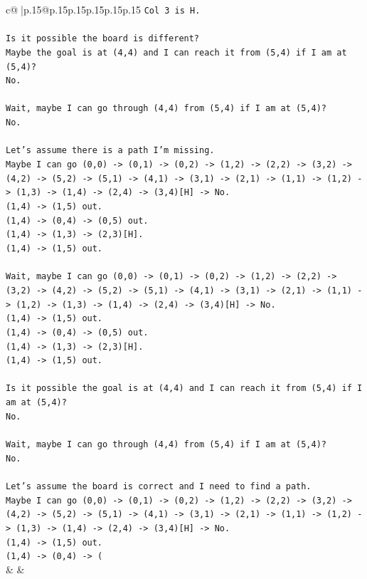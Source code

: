 \documentclass{article}
\begin{document}
{\begin{supertabular}{c@{$\;$}|p{.15\linewidth}@{}p{.15\linewidth}p{.15\linewidth}p{.15\linewidth}p{.15\linewidth}p{.15\linewidth}}
{{{\texttt{Col 3 is H.} \\
\\ 
\texttt{Is it possible the board is different?} \\
\texttt{Maybe the goal is at (4,4) and I can reach it from (5,4) if I am at (5,4)?} \\
\texttt{No.} \\
\\ 
\texttt{Wait, maybe I can go through (4,4) from (5,4) if I am at (5,4)?} \\
\texttt{No.} \\
\\ 
\texttt{Let's assume there is a path I'm missing.} \\
\texttt{Maybe I can go (0,0) {-}> (0,1) {-}> (0,2) {-}> (1,2) {-}> (2,2) {-}> (3,2) {-}> (4,2) {-}> (5,2) {-}> (5,1) {-}> (4,1) {-}> (3,1) {-}> (2,1) {-}> (1,1) {-}> (1,2) {-}> (1,3) {-}> (1,4) {-}> (2,4) {-}> (3,4){[}H{]} {-}> No.} \\
\texttt{(1,4) {-}> (1,5) out.} \\
\texttt{(1,4) {-}> (0,4) {-}> (0,5) out.} \\
\texttt{(1,4) {-}> (1,3) {-}> (2,3){[}H{]}.} \\
\texttt{(1,4) {-}> (1,5) out.} \\
\\ 
\texttt{Wait, maybe I can go (0,0) {-}> (0,1) {-}> (0,2) {-}> (1,2) {-}> (2,2) {-}> (3,2) {-}> (4,2) {-}> (5,2) {-}> (5,1) {-}> (4,1) {-}> (3,1) {-}> (2,1) {-}> (1,1) {-}> (1,2) {-}> (1,3) {-}> (1,4) {-}> (2,4) {-}> (3,4){[}H{]} {-}> No.} \\
\texttt{(1,4) {-}> (1,5) out.} \\
\texttt{(1,4) {-}> (0,4) {-}> (0,5) out.} \\
\texttt{(1,4) {-}> (1,3) {-}> (2,3){[}H{]}.} \\
\texttt{(1,4) {-}> (1,5) out.} \\
\\ 
\texttt{Is it possible the goal is at (4,4) and I can reach it from (5,4) if I am at (5,4)?} \\
\texttt{No.} \\
\\ 
\texttt{Wait, maybe I can go through (4,4) from (5,4) if I am at (5,4)?} \\
\texttt{No.} \\
\\ 
\texttt{Let's assume the board is correct and I need to find a path.} \\
\texttt{Maybe I can go (0,0) {-}> (0,1) {-}> (0,2) {-}> (1,2) {-}> (2,2) {-}> (3,2) {-}> (4,2) {-}> (5,2) {-}> (5,1) {-}> (4,1) {-}> (3,1) {-}> (2,1) {-}> (1,1) {-}> (1,2) {-}> (1,3) {-}> (1,4) {-}> (2,4) {-}> (3,4){[}H{]} {-}> No.} \\
\texttt{(1,4) {-}> (1,5) out.} \\
\texttt{(1,4) {-}> (0,4) {-}> (} \\
            }
        }
    }
    & & \\ \\


\end{supertabular}}
\end{document}
